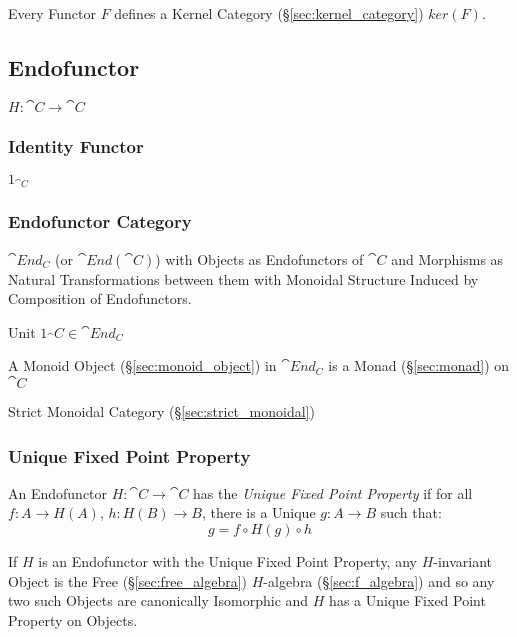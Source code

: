Every Functor $F$ defines a Kernel Category
(\S\ref{sec:kernel_category}) $ker(F)$.



\subsection{Endofunctor}\label{sec:endofunctor}

$H : \cat{C} \rightarrow \cat{C}$



\subsubsection{Identity Functor}\label{sec:identity_functor}

$1_{\cat{C}}$



\subsubsection{Endofunctor Category}\label{sec:endofunctor_category}

$\cat{End_C}$ (or $\cat{End}(\cat{C})$) with Objects as
Endofunctors of $\cat{C}$ and Morphisms as Natural Transformations
between them with Monoidal Structure Induced by Composition of
Endofunctors.

Unit $1_\cat{C} \in \cat{End_C}$

A Monoid Object (\S\ref{sec:monoid_object}) in $\cat{End_C}$ is a
Monad (\S\ref{sec:monad}) on $\cat{C}$

Strict Monoidal Category (\S\ref{sec:strict_monoidal})



\subsubsection{Unique Fixed Point Property}\label{sec:ufpp}

An Endofunctor $H : \cat{C} \rightarrow \cat{C}$ has the \emph{Unique
  Fixed Point Property} if for all $f : A \rightarrow H(A)$, $h : H(B)
\rightarrow B$, there is a Unique $g : A \rightarrow B$ such that:
\[
  g = f \circ H(g) \circ h
\]

If $H$ is an Endofunctor with the Unique Fixed Point Property, any
$H$-invariant Object is the Free (\S\ref{sec:free_algebra})
$H$-algebra (\S\ref{sec:f_algebra}) and so any two such Objects are
canonically Isomorphic and $H$ has a Unique Fixed Point Property on
Objects.



